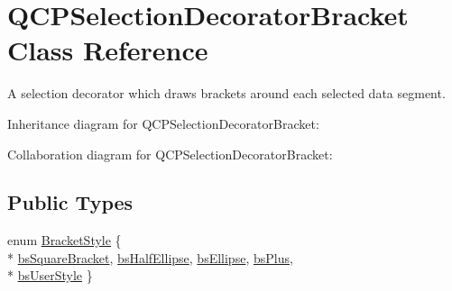 \hypertarget{classQCPSelectionDecoratorBracket}{}\section{Q\+C\+P\+Selection\+Decorator\+Bracket Class Reference}
\label{classQCPSelectionDecoratorBracket}


A selection decorator which draws brackets around each selected data segment.  




Inheritance diagram for Q\+C\+P\+Selection\+Decorator\+Bracket\+:


Collaboration diagram for Q\+C\+P\+Selection\+Decorator\+Bracket\+:
\subsection*{Public Types}
\begin{DoxyCompactItemize}
\item 
enum \hyperlink{classQCPSelectionDecoratorBracket_aa6d18517ec0553575bbef0de4252336e}{Bracket\+Style} \{ \\*
\hyperlink{classQCPSelectionDecoratorBracket_aa6d18517ec0553575bbef0de4252336eaa10a8d25d409b09256a13220a4d74f81}{bs\+Square\+Bracket}, 
\hyperlink{classQCPSelectionDecoratorBracket_aa6d18517ec0553575bbef0de4252336eafa8ad19b1822c9c03fbe5e9ff8eeeea2}{bs\+Half\+Ellipse}, 
\hyperlink{classQCPSelectionDecoratorBracket_aa6d18517ec0553575bbef0de4252336ea7cab0f2f406e293094a7a1e4903f6e8c}{bs\+Ellipse}, 
\hyperlink{classQCPSelectionDecoratorBracket_aa6d18517ec0553575bbef0de4252336ea86eb6ae27e6296576fdc46d13c840530}{bs\+Plus}, 
\\*
\hyperlink{classQCPSelectionDecoratorBracket_aa6d18517ec0553575bbef0de4252336ea5a627cacdaa30ce434371d6a034b991d}{bs\+User\+Style}
 \}
\end{DoxyCompactItemize}
